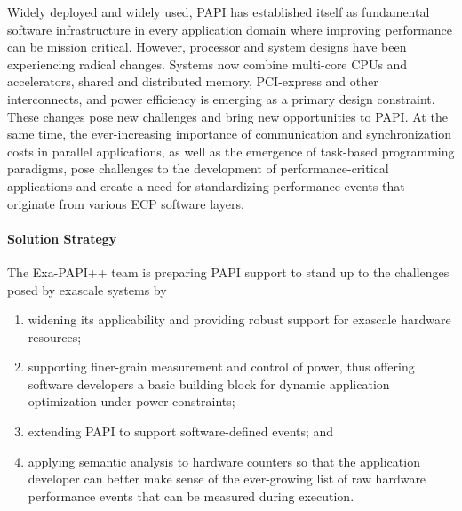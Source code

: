 Widely deployed and widely used, PAPI has established itself as fundamental
software infrastructure in every application domain where improving performance
can be mission critical. 
However, processor and system designs have been experiencing radical changes.
Systems now combine multi-core CPUs and accelerators, shared and
distributed memory, PCI-express and other interconnects, and
power efficiency is emerging as a primary design constraint.
These changes pose new challenges and bring new
opportunities to PAPI. At the same time, the ever-increasing importance of
communication and synchronization costs in parallel applications, as well as the
emergence of task-based programming paradigms, pose
challenges to the development of performance-critical applications and create a
need for standardizing performance events that originate from various ECP
software layers.


\paragraph{Solution Strategy}

The Exa-PAPI++ team is preparing PAPI support to stand up to 
the challenges posed by exascale systems by 
\begin{enumerate}
\item widening its applicability and providing robust support for exascale 
hardware resources;
\item supporting finer-grain measurement and control of power, thus offering 
software developers a basic building block for dynamic application optimization 
under power constraints; 
\item extending PAPI to support software-defined events; and 
\item applying semantic analysis to hardware counters so that the application 
developer can better make sense of the ever-growing list of raw hardware 
performance events that can be measured during execution. 
\end{enumerate}


